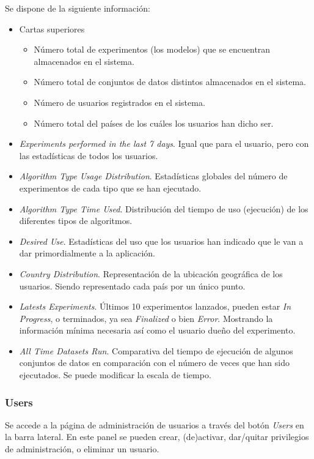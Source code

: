 Se dispone de la siguiente información:
\begin{itemize}
\item Cartas superiores
\begin{itemize}
	\item Número total de experimentos (los modelos) que se encuentran almacenados en el sistema.
	\item Número total de conjuntos de datos distintos almacenados en el sistema.
	\item Número de usuarios registrados en el sistema.
	\item Número total del países de los cuáles los usuarios han dicho ser.
\end{itemize}
\item \textit{Experiments performed in the last 7 days}. Igual que para el usuario, pero con las estadísticas de todos los usuarios. 
\item \textit{Algorithm Type Usage Distribution}. Estadísticas globales del número de experimentos de cada tipo que se han ejecutado.
\item \textit{Algorithm Type Time Used}. Distribución del tiempo de uso (ejecución) de los diferentes tipos de algoritmos.
\item \textit{Desired Use}. Estadísticas del uso que los usuarios han indicado que le van a dar primordialmente a la aplicación.
\item \textit{Country Distribution}. Representación de la ubicación geográfica de los usuarios. Siendo representado cada país por un único punto.
\item \textit{Latests Experiments}. Últimos 10 experimentos lanzados, pueden estar \textit{In Progress}, o terminados, ya sea \textit{Finalized} o bien \textit{Error}. Mostrando la información mínima necesaria así como el usuario dueño del experimento.
\item \textit{All Time Datasets Run}. Comparativa del tiempo de ejecución de algunos conjuntos de datos en comparación con el número de veces que han sido ejecutados. Se puede modificar la escala de tiempo.
\end{itemize}

\subsubsection{Users}
Se accede a la página de administración de usuarios a través del botón \textit{Users} en la barra lateral. En este panel se pueden crear, (de)activar, dar/quitar privilegios de administración, o eliminar un usuario.

